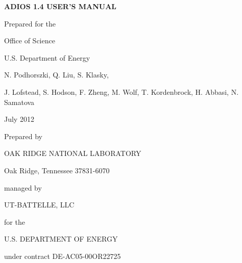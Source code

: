 \begin{center}
{\Large \textbf{ADIOS 1.4 USER'S MANUAL}}

\vspace{60pt}
Prepared for the

Office of Science

U.S. Department of Energy

N. Podhorszki, Q. Liu, S. Klasky, 

J. Lofstead, S. Hodson, F. Zheng, M. Wolf, T. Kordenbrock, H. Abbasi, N. Samatova

July 2012

\vspace{72pt}
Prepared by

OAK RIDGE NATIONAL LABORATORY

Oak Ridge, Tennessee 37831-6070

managed by

UT-BATTELLE, LLC

for the

U.S. DEPARTMENT OF ENERGY

under contract DE-AC05-00OR22725

\end{center}


\newpage

\tableofcontents


\newpage

\listoffigures


\newpage

